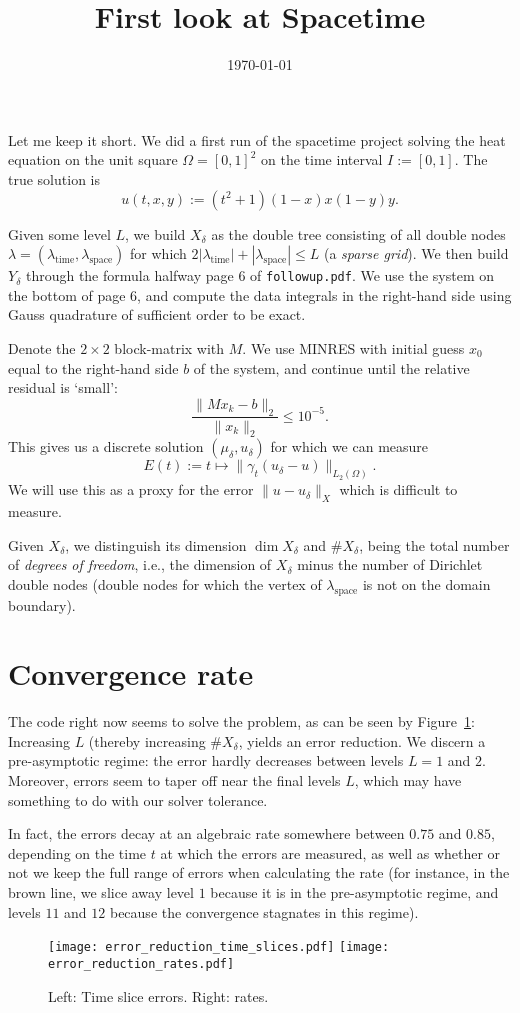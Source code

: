 \documentclass[11pt,a4paper]{amsart}
\date{\today}
\theoremstyle{definition}
\begin{document}
\title{First look at Spacetime}
\maketitle

Let me keep it short. We did a first run of the spacetime project solving the
heat equation on the unit square $\Omega = [0,1]^2$ on the time interval
$I := [0,1]$. The true solution is 
\[
  u(t,x,y) := (t^2 + 1) (1-x)x(1-y)y.
\]

Given some level $L$, we build $X_\delta$ as the double tree consisting of all
double nodes $\lambda = (\lambda_{\text{time}}, \lambda_{\text{space}})$ for
which $2|\lambda_{\text{time}}| + |\lambda_{\text{space}}| \leq L$ (a \emph{sparse grid}).
We then build $Y_\delta$ through the formula halfway page 6 of \texttt{followup.pdf}.
We use the system on the bottom of page 6, and compute the data integrals in the
right-hand side using Gauss quadrature of sufficient order to be exact.

Denote the $2 \times 2$ block-matrix with $M$. We use MINRES with initial guess $x_0$
equal to the right-hand side $b$ of the system, and continue until the relative residual is `small':
\[
  \frac{\|Mx_k - b\|_2}{\|x_k\|_2} \leq 10^{-5}.
\]
This gives us a discrete solution $(\mu_\delta, u_\delta)$ for which we can measure
\[
  E(t) := t \mapsto \|\gamma_t(u_\delta - u)\|_{L_2(\Omega)}.
\]
We will use this as a proxy for the error $\|u - u_\delta\|_X$ which is difficult to measure.

Given $X_\delta$, we distinguish its dimension $\dim X_\delta$ and $\# X_\delta$,
being the total number of \emph{degrees of freedom}, i.e., the dimension of $X_\delta$
minus the number of Dirichlet double nodes (double nodes for which the vertex of
$\lambda_{\text{space}}$ is not on the domain boundary).

\section*{Convergence rate}
The code right now seems to solve the problem, as can be seen by Figure~\ref{fig:time-slice}:
Increasing $L$ (thereby increasing $\# X_\delta$, yields an error reduction.
We discern a pre-asymptotic regime: the error hardly decreases between levels $L=1$
and $2$. Moreover, errors seem to taper off near the final levels $L$, which may
have something to do with our solver tolerance.

In fact, the errors decay at an algebraic rate somewhere between $0.75$ and $0.85$,
depending on the time $t$ at which the errors are measured, as well as whether or
not we keep the full range of errors when calculating the rate (for instance, in
the brown line, we slice away level $1$ because it is in the pre-asymptotic regime,
and levels $11$ and $12$ because the convergence stagnates in this regime).
\begin{figure}[h!]
  \texttt{[image: error\_reduction\_time\_slices.pdf]}
  \texttt{[image: error\_reduction\_rates.pdf]}
  \caption{Left: Time slice errors. Right: rates.}
  \label{fig:time-slice}
\end{figure}
\end{document}
